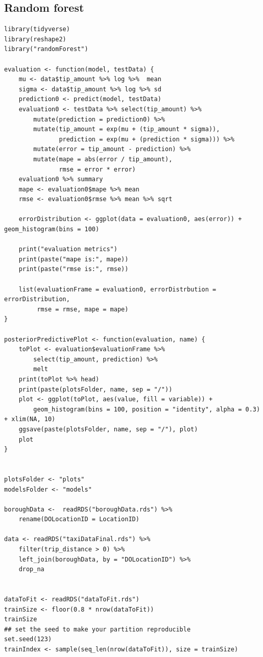 \documentclass[11pt]{article}
\begin{document}
\subsection{Random forest}
\label{sec:org892cd8a}
\begin{verbatim}
library(tidyverse)
library(reshape2)
library("randomForest")

evaluation <- function(model, testData) {
    mu <- data$tip_amount %>% log %>%  mean
    sigma <- data$tip_amount %>% log %>% sd
    prediction0 <- predict(model, testData)
    evaluation0 <- testData %>% select(tip_amount) %>%
        mutate(prediction = prediction0) %>%
        mutate(tip_amount = exp(mu + (tip_amount * sigma)),
               prediction = exp(mu + (prediction * sigma))) %>%
        mutate(error = tip_amount - prediction) %>%
        mutate(mape = abs(error / tip_amount),
               rmse = error * error)
    evaluation0 %>% summary
    mape <- evaluation0$mape %>% mean
    rmse <- evaluation0$rmse %>% mean %>% sqrt

    errorDistribution <- ggplot(data = evaluation0, aes(error)) + geom_histogram(bins = 100)

    print("evaluation metrics")
    print(paste("mape is:", mape))
    print(paste("rmse is:", rmse))

    list(evaluationFrame = evaluation0, errorDistrbution = errorDistribution,
         rmse = rmse, mape = mape)
}

posteriorPredictivePlot <- function(evaluation, name) {
    toPlot <- evaluation$evaluationFrame %>%
        select(tip_amount, prediction) %>%
        melt
    print(toPlot %>% head)
    print(paste(plotsFolder, name, sep = "/"))
    plot <- ggplot(toPlot, aes(value, fill = variable)) +
        geom_histogram(bins = 100, position = "identity", alpha = 0.3) + xlim(NA, 10)
    ggsave(paste(plotsFolder, name, sep = "/"), plot)
    plot
}


plotsFolder <- "plots"
modelsFolder <- "models"

boroughData <-  readRDS("boroughData.rds") %>%
    rename(DOLocationID = LocationID)

data <- readRDS("taxiDataFinal.rds") %>%
    filter(trip_distance > 0) %>%
    left_join(boroughData, by = "DOLocationID") %>%
    drop_na


dataToFit <- readRDS("dataToFit.rds")
trainSize <- floor(0.8 * nrow(dataToFit))
trainSize
## set the seed to make your partition reproducible
set.seed(123)
trainIndex <- sample(seq_len(nrow(dataToFit)), size = trainSize)


\end{verbatim}
\end{document}
